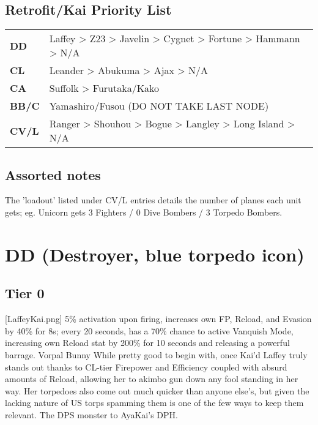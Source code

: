 \subsection{Retrofit/Kai Priority List}
\begin{tabularx}{\textwidth}{>{\bfseries}lX}
    DD                  & Laffey > Z23 > Javelin > Cygnet > Fortune > Hammann > N/A\\
    CL                  & Leander > Abukuma > Ajax > N/A\\
    CA                  & Suffolk > Furutaka/Kako\\
    BB/C                & Yamashiro/Fusou (DO NOT TAKE LAST NODE)\\
    CV/L                & Ranger > Shouhou > Bogue > Langley > Long Island > N/A\\
\end{tabularx}
 

\subsection{Assorted notes}
The 'loadout' listed under CV/L entries details the number of planes each unit gets; eg. Unicorn gets 3 Fighters / 0 Dive Bombers / 3 Torpedo Bombers.
 
\newpage
\section[DD]{DD (Destroyer, blue torpedo icon)}
\subsection{Tier 0}
[LaffeyKai.png]
{5\% activation upon firing, increases own FP, Reload, and Evasion by 40\% for 8s; every 20 seconds, has a 70\% chance to active Vanquish Mode, increasing own Reload stat by 200\% for 10 seconds and releasing a powerful barrage.}
{Vorpal Bunny}
{While pretty good to begin with, once Kai'd Laffey truly stands out thanks to CL-tier Firepower and Efficiency coupled with absurd amounts of Reload, allowing her to akimbo gun down any fool standing in her way. Her torpedoes also come out much quicker than anyone else's, but given the lacking nature of US torps spamming them is one of the few ways to keep them relevant. The DPS monster to AyaKai's DPH.}

